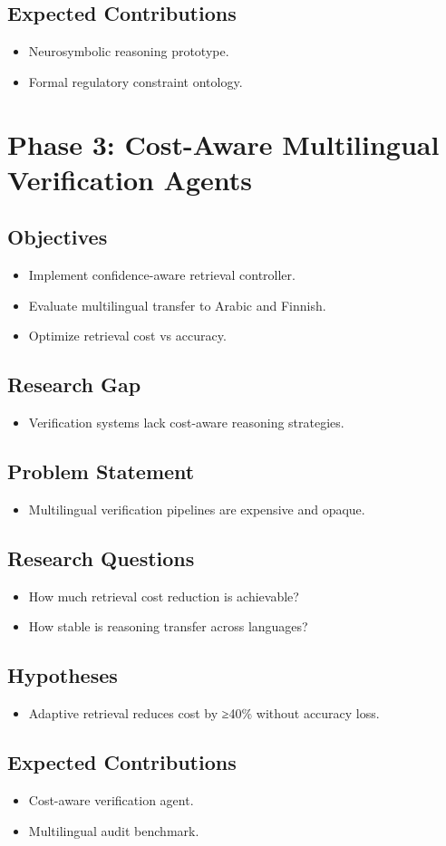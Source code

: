 \documentclass{article}
\begin{document}
\subsection{Expected Contributions}
\begin{itemize}
  \item Neurosymbolic reasoning prototype.
  \item Formal regulatory constraint ontology.
\end{itemize}
\section{Phase 3: Cost-Aware Multilingual Verification Agents}
\subsection{Objectives}
\begin{itemize}
  \item Implement confidence-aware retrieval controller.
  \item Evaluate multilingual transfer to Arabic and Finnish.
  \item Optimize retrieval cost vs accuracy.
\end{itemize}
\subsection{Research Gap}
\begin{itemize}
  \item Verification systems lack cost-aware reasoning strategies.
\end{itemize}
\subsection{Problem Statement}
\begin{itemize}
  \item Multilingual verification pipelines are expensive and opaque.
\end{itemize}
\subsection{Research Questions}
\begin{itemize}
  \item How much retrieval cost reduction is achievable?
  \item How stable is reasoning transfer across languages?
\end{itemize}
\subsection{Hypotheses}
\begin{itemize}
  \item Adaptive retrieval reduces cost by ≥40\% without accuracy loss.
\end{itemize}
\subsection{Expected Contributions}
\begin{itemize}
  \item Cost-aware verification agent.
  \item Multilingual audit benchmark.
\end{itemize}
\end{document}

